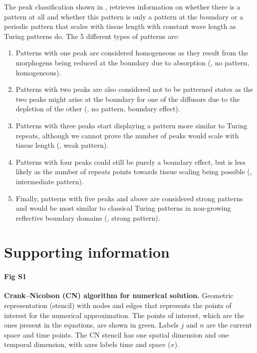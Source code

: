 \documentclass[10pt,letterpaper]{article}
\begin{document}
The peak classification shown in , retrieves information on whether there is a pattern at all and whether this pattern is only a pattern at the boundary or a periodic pattern that scales with tissue length with constant wave length as Turing patterns do.
The 5 different types of patterns are:
\begin{enumerate}
    \item Patterns with one peak are considered homogeneous as they result from the morphogens being reduced at the boundary due to absorption (, no pattern, homogeneous).
    \item Patterns with two peaks are also considered not to be patterned states as the two peaks might arise at the boundary for one of the diffusors due to the depletion of the other (, no pattern, boundary effect).
    \item Patterns with three peaks start displaying a pattern more similar to Turing repeats, although we cannot prove the number of peaks would scale with tissue length  (, weak pattern).
    \item Patterns with four peaks could still be purely a boundary effect, but is less likely as the number of repeats points towards tissue scaling being possible (, intermediate pattern).
    \item Finally, patterns with five peaks and above are considered strong patterns and would be most similar to classical Turing patterns in non-growing reflective boundary domains (, strong pattern).
\end{enumerate}





\section*{Supporting information}
%
\paragraph*{Fig S1}
\label{sup_fig1}
{\bf Crank–Nicolson (CN) algorithm for numerical solution.}  Geometric representation (stencil) with nodes and edges that represents the points of interest for the numerical approximation. The points of interest, which are the ones present in the equations, are shown in green. Labels $j$ and $n$ are the current space and time points. The CN stencil has one spatial dimension and one temporal dimension, with axes labels time and space ($x$).
\end{document}
